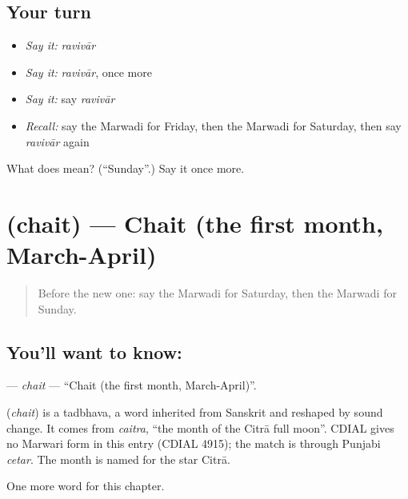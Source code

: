 \subsection*{Your turn}
\begin{itemize}
\raggedright
  \item \emph{Say it:} \emph{ravivār}
  \item \emph{Say it:} \emph{ravivār}, once more
  \item \emph{Say it:} say \emph{ravivār}
  \item \emph{Recall:} say the Marwadi for Friday, then the Marwadi for Saturday, then say \emph{ravivār} again
\end{itemize}

\begin{tcolorbox}[breakable,colback=teal!4,colframe=teal!35!black,title={Before you move on}]
What does  mean? (\textquotedblleft{}Sunday\textquotedblright{}.) Say it once more.
\end{tcolorbox}
\section[\texorpdfstring{\mw{चैत} (chait)}{चैत (chait)}]{ (chait) — Chait (the first month, March-April)}

\label{lesson:MW-C92-chait}



\begin{quote}
Before the new one: say the Marwadi for Saturday, then the Marwadi for Sunday.
\end{quote}

\subsection*{You'll want to know: }
\textbf{} — \emph{chait} — \textquotedblleft{}Chait (the first month, March-April)\textquotedblright{}.

\begin{cousinweb}
\textbf{} (\emph{chait}) is a tadbhava, a word inherited from Sanskrit and reshaped by sound change. It comes from \emph{caitra}, \textquotedblleft{}the month of the Citrā full moon\textquotedblright{}. CDIAL gives no Marwari form in this entry (CDIAL 4915); the match is through Punjabi \emph{cetar}. The month is named for the star Citrā.
\end{cousinweb}

\begin{grammarlens}[title={What you've built}]
One more word for this chapter.
\end{grammarlens}

